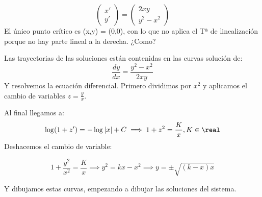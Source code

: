 \documentclass[nochap]{apuntes}
\begin{document}
\begin{problem}[2]
\[\begin{pmatrix}
x'\\y'
\end{pmatrix} = \begin{pmatrix}
2xy\\y^2-x^2
\end{pmatrix}\]
\solution
El único punto crítico es (x,y) = (0,0), con lo que no aplica el Tª de linealización porque no hay parte lineal a la derecha. ¿Como?

Las trayectorias de las soluciones están contenidas en las curvas solución de:
\[\frac{dy}{dx} = \frac{y^2-x^2}{2xy}\]
Y resolvemos la ecuación diferencial. Primero dividimos por $x^2$ y aplicamos el cambio de variables $z=\frac{y}{x}$.

Al final llegamos a:
\[\log(1+z') = -\log|x| + C \implies 1+z^2 = \frac{K}{x},K\in\real\]
Deshacemos el cambio de variable:

\[1+\frac{y^2}{x^2} = \frac{K}{x}\implies y^2 = kx-x^2 \implies y = \pm \sqrt{(k-x)x}\]

Y dibujamos estas curvas, empezando a dibujar las soluciones del sistema.

\end{problem}
\end{document}
